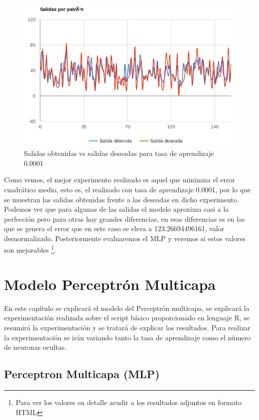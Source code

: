 \documentclass[11pt,spanish,listoffigures,listoftables]{workluis}
\begin{document}
\begin{figure}[H]
\centering
\includegraphics[scale=0.5]{bestadaline}
\caption{Salidas obtenidas vs salidas deseadas para tasa de aprendizaje 0.0001}\label{fig:bestadaline}
\end{figure}

\par Como vemos, el mejor experimento realizado es aquel que minimiza el error cuadrático medio, esto es, el realizado con tasa de aprendizaje 0.0001, por lo que se muestran las salidas obtenidas frente a las deseadas en dicho experimento. Podemos ver que para algunas de las salidas el modelo aproxima casi a la perfección pero para otras hay grandes diferencias, en esas diferencias es en las que se genera el error que en este caso se eleva a 123.26694496161, valor desnormalizado. Posteriormente evaluaremos el MLP y veremos si estos valores son mejorables \footnote{Para ver los valores en detalle acudir a los resultados adjuntos en formato HTML}.

\chapter{Modelo Perceptrón Multicapa}

\par En este capítulo se explicará el modelo del Perceptrón multicapa, se explicará la experimentación realizada sobre el script básico proporcionado en lenguaje R, se resumirá la experimentación y se tratará de explicar los resultados. Para realizar la experimentación se irán variando tanto la tasa de aprendizaje como el número de neuronas ocultas.

\section{Perceptron Multicapa (MLP)}
\end{document}
